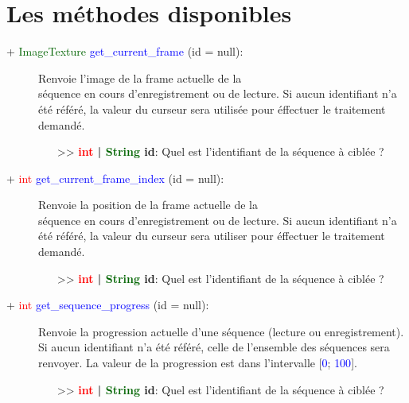 \documentclass[a4paper, 11pt]{article}
\begin{document}
	\section{Les méthodes disponibles}
	\begin{description}
		\item [+ \textcolor{darkgreen}{ImageTexture} \textcolor{blue}{get\_current\_frame} (id = null):]
		Renvoie l'image de la frame actuelle de la \\séquence en cours d'enregistrement ou de lecture. Si
		aucun identifiant n'a été référé, la valeur du curseur sera utilisée pour éffectuer le traitement
		demandé.
		\begin{itemize}
			\item [>> \textbf{\textcolor{red}{int} | \textcolor{darkgreen}{String} id}:] Quel est
			l'identifiant de la séquence à ciblée ?\\
		\end{itemize}
	\end{description}
	\begin{description}
		\item [+ \textcolor{red}{int} \textcolor{blue}{get\_current\_frame\_index} (id = null):] Renvoie la
		position de la frame actuelle de la \\séquence en cours d'enregistrement ou de lecture. Si aucun
		identifiant n'a été référé, la valeur du curseur sera utiliser pour éffectuer le traitement demandé.
		\begin{itemize}
			\item [>> \textbf{\textcolor{red}{int} | \textcolor{darkgreen}{String} id}:] Quel est
			l'identifiant de la séquence à ciblée ?\\
		\end{itemize}
	\end{description}
	\begin{description}
		\item [+ \textcolor{red}{int} \textcolor{blue}{get\_sequence\_progress} (id = null):] Renvoie la
		progression actuelle d'une séquence (lecture ou enregistrement). Si aucun identifiant n'a été
		référé, celle de l'ensemble des séquences sera renvoyer. La valeur de la progression est dans 
		l'intervalle [\textcolor{blue}{0}; \textcolor{blue}{100}].
		\begin{itemize}
			\item [>> \textbf{\textcolor{red}{int} | \textcolor{darkgreen}{String} id}:] Quel est
			l'identifiant de la séquence à ciblée ?\\
		\end{itemize}
	\end{description}
\end{document}
